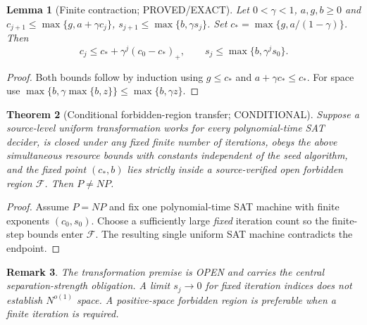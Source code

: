 \documentclass[11pt]{article}
\newtheorem{theorem}{Theorem}[section]
\newtheorem{lemma}[theorem]{Lemma}
\newtheorem{remark}[theorem]{Remark}
\begin{document}
\begin{lemma}[Finite contraction; PROVED/EXACT]
Let $0<\gamma<1$, $a,g,b\ge0$ and
$c_{j+1}\le\max\{g,a+\gamma c_j\}$,
$s_{j+1}\le\max\{b,\gamma s_j\}$. Set
$c_*=\max\{g,a/(1-\gamma)\}$. Then
\[
c_j\le c_*+\gamma^j(c_0-c_*)_+,\qquad
s_j\le\max\{b,\gamma^js_0\}.
\]
\end{lemma}
\begin{proof}
Both bounds follow by induction using $g\le c_*$ and
$a+\gamma c_*\le c_*$. For space use
$\max\{b,\gamma\max\{b,z\}\}\le\max\{b,\gamma z\}$.
\end{proof}

\begin{theorem}[Conditional forbidden-region transfer; CONDITIONAL]
Suppose a source-level uniform transformation works for every
polynomial-time SAT decider, is closed under any fixed finite number
of iterations, obeys the above simultaneous resource bounds with
constants independent of the seed algorithm, and the fixed point
$(c_*,b)$ lies strictly inside a source-verified open forbidden region
$\mathcal F$. Then $P\ne NP$.
\end{theorem}
\begin{proof}
Assume $P=NP$ and fix one polynomial-time SAT machine with finite
exponents $(c_0,s_0)$. Choose a sufficiently large \emph{fixed}
iteration count so the finite-step bounds enter $\mathcal F$.
The resulting single uniform SAT machine contradicts the endpoint.
\end{proof}
\begin{remark}
The transformation premise is OPEN and carries the central
separation-strength obligation. A limit $s_j\to0$ for fixed iteration
indices does not establish $N^{o(1)}$ space. A positive-space
forbidden region is preferable when a finite iteration is required.
\end{remark}
\end{document}
